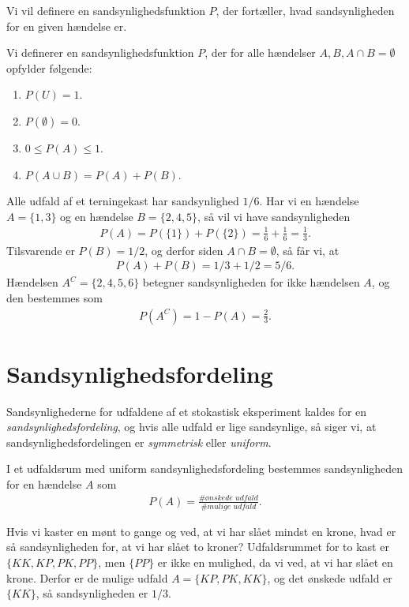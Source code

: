 Vi vil definere en sandsynlighedsfunktion $P$, der fortæller, hvad sandsynligheden for en given hændelse er.
\begin{defn}
Vi definerer en sandsynlighedsfunktion $P$, der for alle hændelser $A,B, A\cap B = \emptyset$ opfylder følgende:
\begin{enumerate}[label=\roman*)]
\item $P(U)=1$.
\item $P(\emptyset) = 0$.
\item $0 \leq P(A) \leq 1$.
\item $P(A \cup B) = P(A) + P(B)$.
\end{enumerate}
\end{defn}
\begin{exa}
Alle udfald af et terningekast har sandsynlighed $1/6$. Har vi en hændelse $A= \{1,3\}$ og en hændelse $B= \{2,4,5\}$, så vil vi have sandsynligheden
\begin{align*}
P(A) = P(\{1\}) + P(\{2\}) =  \frac{1}{6} + \frac{1}{6} = \frac{1}{3}.
\end{align*}
Tilsvarende er $P(B) = 1/2$, og derfor siden $A \cap B = \emptyset$, så får vi, at
\begin{align*}
P(A)+P(B) = 1/3+1/2 = 5/6.
\end{align*}
Hændelsen $A^C=\{2,4,5,6\}$ betegner sandsynligheden for ikke hændelsen $A$, og den bestemmes som
\begin{align*}
P(A^C) = 1-P(A) = \frac{2}{3}.
\end{align*}  
\end{exa}
\section*{Sandsynlighedsfordeling}

Sandsynlighederne for udfaldene af et stokastisk eksperiment kaldes for en \textit{sandsynlighedsfordeling}, og hvis alle udfald er lige sandsynlige, så siger vi, at sandsynlighedsfordelingen er \textit{symmetrisk} eller \textit{uniform}.
\begin{setn}
I et udfaldsrum med uniform sandsynlighedsfordeling bestemmes sandsynligheden for en hændelse $A$ som
\begin{align*}
P(A) = \frac{\# \textit{ønskede udfald}}{\# \textit{mulige udfald}}.
\end{align*}
\end{setn}
\begin{exa}
Hvis vi kaster en mønt to gange og ved, at vi har slået mindst en krone, hvad er så sandsynligheden for, at vi har slået to kroner?
Udfaldsrummet for to kast er $\{KK,KP,PK,PP\}$, men $\{PP\}$ er ikke en mulighed, da vi ved, at vi har slået en krone. Derfor er de mulige udfald $A=\{KP,PK,KK\}$, og det ønskede udfald er $\{KK\}$, så sandsynligheden er $1/3$. 
\end{exa}

